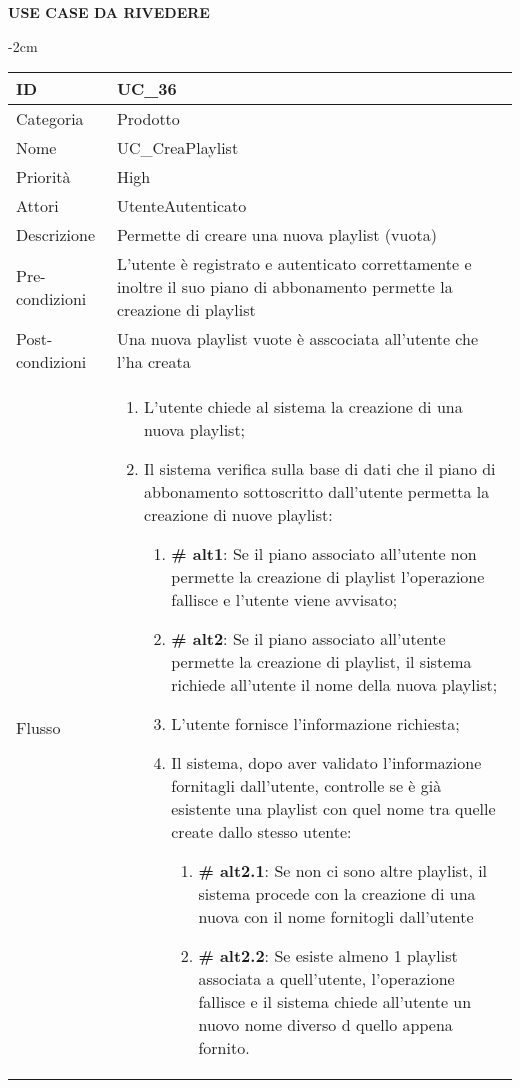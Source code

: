 \begin{center}

\textbf{USE CASE DA RIVEDERE} \newline

\begin{table}[bp]
    \centering
    \addtolength{\leftskip} {-2cm}
\begin{tabular}{ |p{2.6cm}|p{13cm}|  }
\hline
ID & UC\_36 \\\hline
Categoria & Prodotto \\\hline
Nome & UC\_CreaPlaylist\\\hline
Priorità & High \\\hline
Attori &  UtenteAutenticato \\\hline
Descrizione & Permette di creare una nuova playlist (vuota)\\\hline
Pre-condizioni & L'utente è registrato e autenticato correttamente e inoltre il suo piano di abbonamento permette la creazione di playlist\\\hline
Post-condizioni & Una nuova playlist vuote è asscociata all'utente che l'ha creata\\\hline
Flusso &  	\vspace{-5mm} \begin{enumerate}
\item L'utente chiede al sistema la creazione di una nuova playlist;
		\item Il sistema verifica sulla base di dati che il piano di abbonamento sottoscritto dall'utente permetta la creazione di nuove playlist:
		 \begin{enumerate}[label*=\arabic*.]
			\item \textbf{\# alt1}: Se il piano associato all'utente non permette la creazione di playlist l'operazione fallisce e l'utente viene avvisato;
			\item \textbf{\# alt2}: Se il piano associato all'utente permette la creazione di playlist, il sistema richiede all'utente il nome della nuova playlist;
			\item L'utente fornisce l'informazione richiesta;
			\item Il sistema, dopo aver validato l'informazione fornitagli dall'utente, controlle se è già esistente una playlist con quel nome tra quelle create dallo stesso utente:
			\begin{enumerate}[label*=\arabic*.]
				\item \textbf{\# alt2.1}: Se non ci sono altre playlist, il sistema procede con la creazione di una nuova con il nome fornitogli dall'utente
				\item \textbf{\# alt2.2}: Se esiste almeno 1 playlist associata a quell'utente, l'operazione fallisce e il sistema chiede all'utente un nuovo nome diverso d quello appena fornito.
			\end{enumerate}
					\end{enumerate}


\end{enumerate}
\end{tabular}
\end{table}
\end{center}
